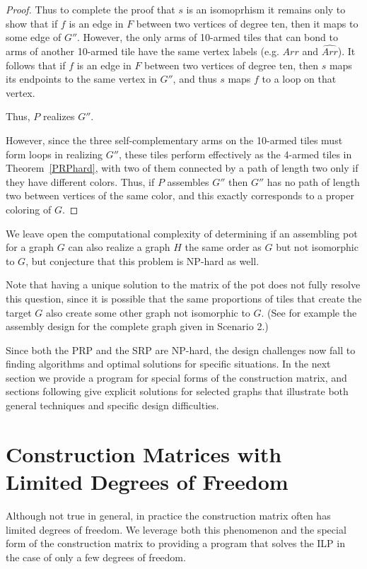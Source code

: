 \documentclass{elsarticle}
\theoremstyle{definition}
\theoremstyle{remark}
\theoremstyle{plain}
\theoremstyle{plain}
\begin{document}
\begin{proof}
Thus to complete the proof that $s$ is an isomoprhism it remains only to show that if $f$ is an edge in $F$ between two vertices of degree ten, then it maps to some edge of $G''$.  However, the only arms of 10-armed tiles that can bond to arms of another 10-armed tile have the same vertex labels (e.g. $Arr$ and $\widehat{Arr}$).  It follows that if $f$ is an edge in $F$ between two vertices of degree ten, then $s$ maps its endpoints  to the same vertex in $G''$, and thus $s$ maps $f$ to a loop on that vertex.

Thus, $P$ realizes $G''$.

However, since the three self-complementary arms on the 10-armed tiles must form loops in realizing $G''$, these tiles perform effectively as the 4-armed tiles in Theorem~\ref{PRPhard}, with two of them connected by a path of length two only if they have different colors.  Thus, if $P$ assembles $G''$ then $G''$ has no path of length two between vertices of the same color, and this exactly corresponds to a proper coloring of $G$. 
\end{proof}

We leave open the computational complexity of determining if an assembling pot for a graph $G$ can also realize a graph $H$ the same order as $G$ but not isomorphic to $G$, but conjecture that this problem is NP-hard as well.

Note that having a unique solution to the matrix of the pot does not fully resolve this question, since it is possible that the same proportions of tiles that create the target $G$ also create some other graph not isomorphic to $G$. (See for example the  assembly design for the complete graph given in Scenario 2.)
 
 Since both the PRP and the SRP are NP-hard, the design challenges now fall to finding algorithms and optimal solutions for specific situations. In the next section we provide a program for special forms of the construction matrix, and   sections following give explicit solutions for selected graphs that illustrate both general techniques and specific design difficulties. 
 
\section{Construction Matrices with Limited Degrees of Freedom}\label{sec:code}
 Although not true in general, in practice the construction matrix often has limited degrees of freedom. We leverage both this phenomenon and the special form of the construction matrix to providing a program that solves the ILP in the case of only a few degrees of freedom.
 
\end{document}
